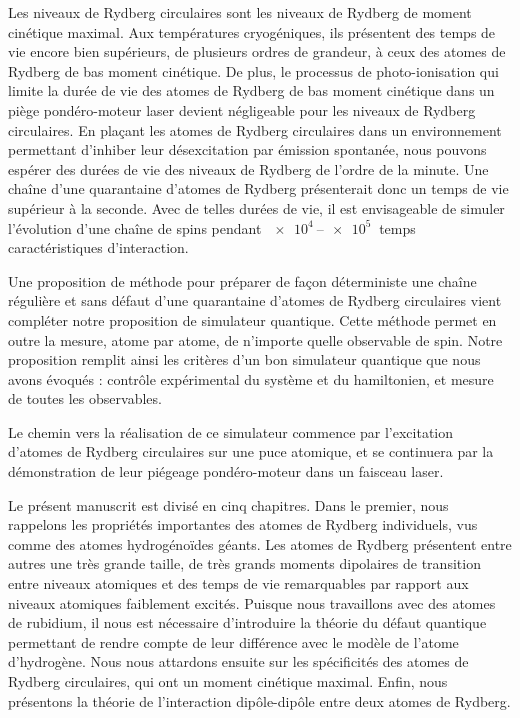 Les niveaux de Rydberg circulaires sont les niveaux de Rydberg de moment cinétique maximal.
Aux températures cryogéniques, ils présentent des temps de vie encore bien supérieurs, de plusieurs ordres de grandeur, à ceux des atomes de Rydberg de bas moment cinétique.
De plus, le processus de photo-ionisation qui limite la durée de vie des atomes de Rydberg de bas moment cinétique dans un piège pondéro-moteur laser devient négligeable pour les niveaux de Rydberg circulaires.
En plaçant les atomes de Rydberg circulaires dans un environnement permettant d'inhiber leur désexcitation par émission spontanée, nous pouvons espérer des durées de vie des niveaux de Rydberg de l'ordre de la minute.
Une chaîne d'une quarantaine d'atomes de Rydberg présenterait donc un temps de vie supérieur à la seconde.
Avec de telles durées de vie, il est envisageable de simuler l'évolution d'une chaîne de spins pendant $\SIrange{e4}{e5}{}$ temps caractéristiques d'interaction.

Une proposition de méthode pour préparer de façon déterministe une chaîne régulière et sans défaut d'une quarantaine d'atomes de Rydberg circulaires vient compléter notre proposition de simulateur quantique.
Cette méthode permet en outre la mesure, atome par atome, de n'importe quelle observable de spin.
Notre proposition remplit ainsi les critères d'un bon simulateur quantique que nous avons évoqués : contrôle expérimental du système et du hamiltonien, et mesure de toutes les observables.

Le chemin vers la réalisation de ce simulateur commence par l'excitation d'atomes de Rydberg circulaires sur une puce atomique, et se continuera par la démonstration de leur piégeage pondéro-moteur dans un faisceau laser.

\bigskip
Le présent manuscrit est divisé en cinq chapitres.
Dans le premier, nous rappelons les propriétés importantes des atomes de Rydberg individuels, vus comme des atomes hydrogénoïdes géants.
Les atomes de Rydberg présentent entre autres une très grande taille, de très grands moments dipolaires de transition entre niveaux atomiques et des temps de vie remarquables par rapport aux niveaux atomiques faiblement excités.
Puisque nous travaillons avec des atomes de rubidium, il nous est nécessaire d'introduire la théorie du défaut quantique permettant de rendre compte de leur différence avec le modèle de l'atome d'hydrogène.
Nous nous attardons ensuite sur les spécificités des atomes de Rydberg circulaires, qui ont un moment cinétique maximal.
Enfin, nous présentons la théorie de l'interaction dipôle-dipôle entre deux atomes de Rydberg.

